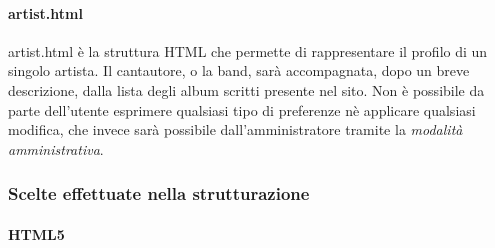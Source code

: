 \paragraph{artist.html} artist.html è la struttura HTML che permette di rappresentare il profilo di un singolo artista. Il cantautore, o la band, sarà accompagnata, dopo un breve descrizione, dalla lista degli album scritti presente nel sito. Non è possibile da parte dell'utente esprimere qualsiasi tipo di preferenze nè applicare qualsiasi modifica, che invece sarà possibile dall'amministratore tramite la \textit{modalità amministrativa}.


\subsubsection{Scelte effettuate nella strutturazione}
\paragraph{HTML5}
